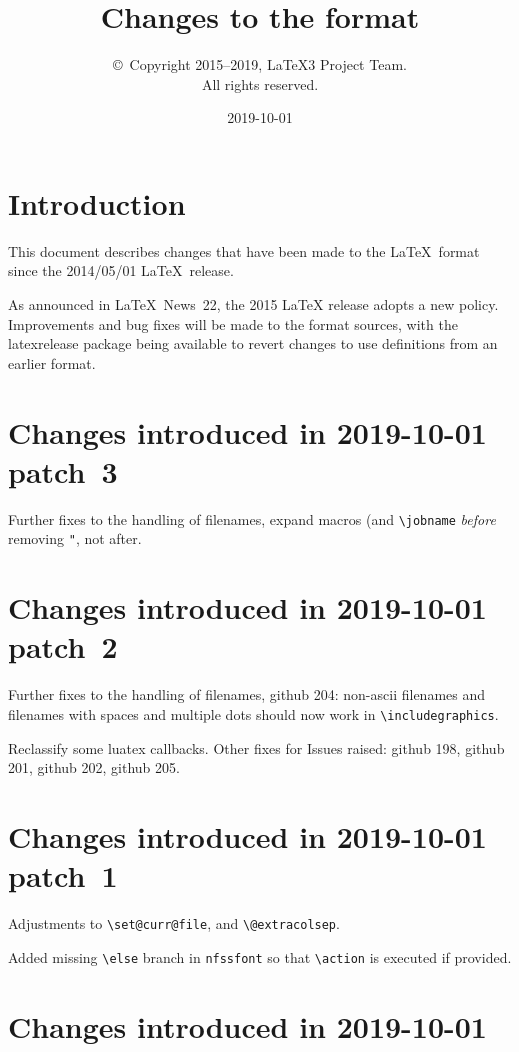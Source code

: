 \documentclass{ltxguide}
\title{Changes to the \LaTeXe{} format}
\author{\copyright~Copyright 2015--2019, \LaTeX3 Project Team.\\
   All rights reserved.}
\date{2019-10-01}
\newcommand\Lpack[1]{\mbox{\textsf{#1}}}
\newcommand\ghissue[1]{github #1}
\newcommand\ltnewsissue[1]{\LaTeX\ News~#1}
\newcommand\ghissue[1]{%
    \href{https://github.com/latex3/latex2e/issues/#1}{github #1}}
\newcommand\ltnewsissue[1]{%
    \href{https://www.latex-project.org/news/latex2e-news/ltnews#1.pdf}{\LaTeX\ News~#1}}
\begin{document}
 
\maketitle
 
\tableofcontents

\newpage
 
\section{Introduction}
 
This document describes changes that have been made to the
\LaTeX\ format since the 2014/05/01 \LaTeX\ release.


As announced in \ltnewsissue{22}, the 2015 \LaTeX{} release adopts a new
policy. Improvements and bug fixes will be made to the format sources,
with the \Lpack{latexrelease} package being available to revert
changes to use definitions from an earlier format.


\section{Changes introduced in 2019-10-01 patch~3}

Further fixes to the handling of filenames, expand macros (and
\verb|\jobname| \emph{before} removing \verb|"|, not after.

\section{Changes introduced in 2019-10-01 patch~2}

Further fixes to the handling of filenames, \ghissue{204}: non-ascii
filenames and filenames with spaces and multiple dots should now work
in \verb|\includegraphics|.

Reclassify some luatex callbacks.  Other fixes for Issues raised:
\ghissue{198}, \ghissue{201}, \ghissue{202}, \ghissue{205}.

\section{Changes introduced in 2019-10-01 patch~1}

Adjustments to \verb|\set@curr@file|, and \verb|\@extracolsep|.

Added missing \verb=\else= branch in \texttt{nfssfont} so that
\verb=\action= is executed if provided.

\section{Changes introduced in 2019-10-01}
\end{document}
